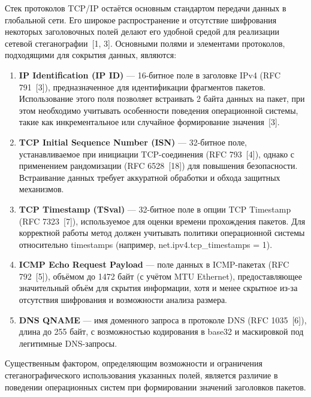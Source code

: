Стек протоколов TCP/IP остаётся основным стандартом передачи данных в глобальной сети. Его широкое распространение и отсутствие шифрования некоторых заголовочных полей делают его удобной средой для реализации сетевой стеганографии~[1, 3]. Основными полями и элементами протоколов, подходящими для сокрытия данных, являются:

\begin{enumerate}[label=\arabic*)]
    \item \textbf{IP Identification (IP ID)} --- 16-битное поле в заголовке IPv4 (RFC 791~[3]), предназначенное для идентификации фрагментов пакетов. Использование этого поля позволяет встраивать 2 байта данных на пакет, при этом необходимо учитывать особенности поведения операционной системы, такие как инкрементальное или случайное формирование значения~[3].
    \item \textbf{TCP Initial Sequence Number (ISN)} --- 32-битное поле, устанавливаемое при инициации TCP-соединения (RFC 793~[4]), однако с применением рандомизации (RFC 6528~[18]) для повышения безопасности. Встраивание данных требует аккуратной обработки и обхода защитных механизмов.
    \item \textbf{TCP Timestamp (TSval)} --- 32-битное поле в опции TCP Timestamp (RFC 7323~[7]), используемое для оценки времени прохождения пакетов. Для корректной работы метод должен учитывать политики операционной системы относительно timestamps (например, net.ipv4.tcp\_timestamps = 1).
    \item \textbf{ICMP Echo Request Payload} --- поле данных в ICMP-пакетах (RFC 792~[5]), объёмом до 1472 байт (с учётом MTU Ethernet), предоставляющее значительный объём для скрытия информации, хотя и менее скрытное из-за отсутствия шифрования и возможности анализа размера.
    \item \textbf{DNS QNAME} --- имя доменного запроса в протоколе DNS (RFC 1035~[6]), длина до 255 байт, с возможностью кодирования в base32 и маскировкой под легитимные DNS-запросы.
\end{enumerate}

Существенным фактором, определяющим возможности и ограничения стеганографического использования указанных полей, является различие в поведении операционных систем при формировании значений заголовков пакетов.


